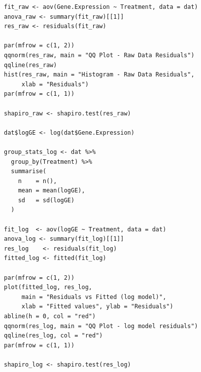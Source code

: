 \documentclass[answers,12pt,addpoints]{exam}
\begin{document}
\begin{verbatim}
fit_raw <- aov(Gene.Expression ~ Treatment, data = dat)
anova_raw <- summary(fit_raw)[[1]]
res_raw <- residuals(fit_raw)

par(mfrow = c(1, 2))
qqnorm(res_raw, main = "QQ Plot - Raw Data Residuals")
qqline(res_raw)
hist(res_raw, main = "Histogram - Raw Data Residuals",
     xlab = "Residuals")
par(mfrow = c(1, 1))

shapiro_raw <- shapiro.test(res_raw)

dat$logGE <- log(dat$Gene.Expression)

group_stats_log <- dat %>%
  group_by(Treatment) %>%
  summarise(
    n    = n(),
    mean = mean(logGE),
    sd   = sd(logGE)
  )

fit_log  <- aov(logGE ~ Treatment, data = dat)
anova_log <- summary(fit_log)[[1]]
res_log    <- residuals(fit_log)
fitted_log <- fitted(fit_log)

par(mfrow = c(1, 2))
plot(fitted_log, res_log,
     main = "Residuals vs Fitted (log model)",
     xlab = "Fitted values", ylab = "Residuals")
abline(h = 0, col = "red")
qqnorm(res_log, main = "QQ Plot - log model residuals")
qqline(res_log, col = "red")
par(mfrow = c(1, 1))

shapiro_log <- shapiro.test(res_log)
\end{verbatim}
\end{document}

